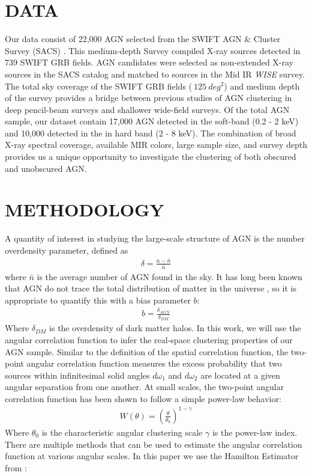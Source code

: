 \documentclass[preprint]{aastex63}
\begin{document}
\section{DATA} 
   Our data consist of 22,000 AGN selected from the SWIFT AGN \& Cluster Survey (SACS) \citep{dai_2015}. This medium-depth Survey
    compiled X-ray sources detected in 739 SWIFT GRB fields. AGN candidates were selected as non-extended X-ray sources in the SACS catalog and matched
    to sources in the Mid IR \textit{WISE} survey. The  total sky coverage of the SWIFT GRB fields ($~125 \ deg^2$) and medium depth of the survey provides a bridge between previous studies of AGN clustering 
    in deep pencil-beam surveys and shallower wide-field surveys. Of the total AGN sample, our dataset contain 17,000 AGN detected in the soft-band (0.2 - 2 keV) and 
    10,000 detected in the in hard band (2 - 8 keV). The combination of broad X-ray spectral coverage, available MIR colors, large sample size, and survey depth provides us 
    a unique opportunity to investigate the clustering of both obscured and unobscured AGN.
    

\section{METHODOLOGY}
A quantity of interest in studying the large-scale structure of AGN is the number overdensity parameter, defined as
\begin{align}
    \label{eq:delta}
    \delta = \frac{n-\bar n}{\bar n}
\end{align}
where $\bar n $ is the average number of AGN found in the sky. It has long been known that AGN do not trace the total
distribution of matter in the universe \citep{bardeen}, so  it is appropriate to quantify this with a bias parameter $b$:
\begin{align}
    \label{eq:bias}
    b = \frac{\delta_{AGN}}{\delta_{DM}}
\end{align}
Where $\delta_{DM}$ is the overdensity of dark matter halos. In this work, we will use the angular correlation function to infer 
the real-space clustering properties of our AGN sample. Similar to the definition of the spatial correlation function, the two-point angular correlation function measures the excess 
 probability that two sources within infinitesimal solid angles $d\omega_1$ and $d\omega_2$ are located at a given angular separation from one another. 
 At small scales, the two-point angular correlation function has been shown to follow a simple power-law behavior:
 \begin{align}
    \label{p_law}
    W(\theta) = \left(\frac{\theta}{\theta_0} \right)^{1-\gamma}
 \end{align}
 Where $\theta_0$ is the characteristic angular clustering scale $\gamma$ is the power-law index.  
 There are multiple methods that can be used to estimate the angular correlation function at various angular scales.
In this paper we use the Hamilton Estimator from \citet{hamilton}:
\end{document}
